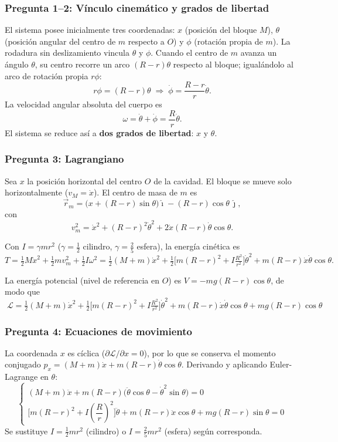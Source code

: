 \begin{sol}

\subsubsection*{Pregunta 1--2: Vínculo cinemático y grados de libertad}

El sistema posee inicialmente tres coordenadas: $x$ (posición del bloque $M$), $\theta$
(posición angular del centro de $m$ respecto a $O$) y $\phi$ (rotación propia de $m$). La
rodadura sin deslizamiento vincula $\theta$ y $\phi$. Cuando el centro de $m$ avanza un
ángulo $\theta$, su centro recorre un arco $(R-r)\theta$ respecto al bloque; igualándolo al
arco de rotación propia $r\phi$:
$$r\phi = (R-r)\theta \;\Longrightarrow\; \dot\phi = \frac{R-r}{r}\dot\theta.$$
La velocidad angular absoluta del cuerpo es
$$\omega = \dot\theta + \dot\phi = \frac{R}{r}\dot\theta.$$
El sistema se reduce así a \textbf{dos grados de libertad}: $x$ y $\theta$.

\subsubsection*{Pregunta 3: Lagrangiano}

Sea $x$ la posición horizontal del centro $O$ de la cavidad. El bloque se mueve solo
horizontalmente ($v_M=\dot x$). El centro de masa de $m$ es
$$\vec{r}_m = \big(x + (R-r)\sin\theta\big)\hat{\imath} - (R-r)\cos\theta\,\hat{\jmath},$$
con
$$v_m^2 = \dot{x}^2 + (R-r)^2\dot\theta^2 + 2\dot{x}(R-r)\dot\theta\cos\theta.$$

Con $I=\gamma m r^2$ ($\gamma=\tfrac12$ cilindro, $\gamma=\tfrac25$ esfera), la energía
cinética es
$$T = \tfrac12 M\dot{x}^2 + \tfrac12 m v_m^2 + \tfrac12 I\omega^2
= \tfrac12(M+m)\dot{x}^2
+ \tfrac12\Big[m(R-r)^2 + I\tfrac{R^2}{r^2}\Big]\dot\theta^2
+ m(R-r)\dot{x}\dot\theta\cos\theta.$$

La energía potencial (nivel de referencia en $O$) es $V=-mg(R-r)\cos\theta$, de modo que
$$\boxed{\;\mathcal{L} = \tfrac12(M+m)\dot{x}^2
+ \tfrac12\Big[m(R-r)^2 + I\tfrac{R^2}{r^2}\Big]\dot\theta^2
+ m(R-r)\dot{x}\dot\theta\cos\theta + mg(R-r)\cos\theta\;}$$

\subsubsection*{Pregunta 4: Ecuaciones de movimiento}

La coordenada $x$ es cíclica ($\partial\mathcal{L}/\partial x=0$), por lo que se conserva
el momento conjugado $p_x=(M+m)\dot{x}+m(R-r)\dot\theta\cos\theta$. Derivando y aplicando
Euler-Lagrange en $\theta$:
$$\boxed{\begin{cases}
(M+m)\ddot{x} + m(R-r)\big(\ddot\theta\cos\theta - \dot\theta^2\sin\theta\big) = 0 \\[4pt]
\Big[m(R-r)^2 + I\left(\dfrac{R}{r}\right)^2\Big]\ddot\theta + m(R-r)\ddot{x}\cos\theta
+ mg(R-r)\sin\theta = 0
\end{cases}}$$
Se sustituye $I=\tfrac12 mr^2$ (cilindro) o $I=\tfrac25 mr^2$ (esfera) según corresponda.

\end{sol}

